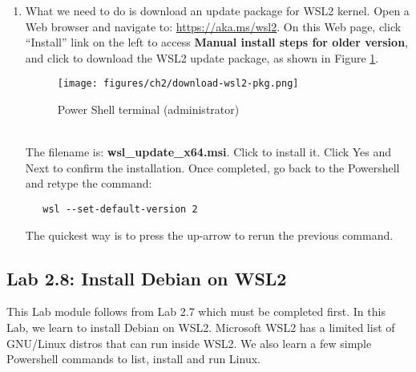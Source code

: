 \begin{enumerate}
\item What we need to do is download an update package for WSL2 kernel. Open a Web browser and navigate to: {\url{https://aka.ms/wsl2}}. On this Web page, click ``Install'' link on the left to access {\bf{Manual install steps for older version}}, and click to download the WSL2 update package, as shown in Figure \ref{fig:download-wsl2}. 
\begin{figure}[hbt!]\centering
\texttt{[image: figures/ch2/download-wsl2-pkg.png]}
\caption{Power Shell terminal (administrator)}\label{fig:download-wsl2} %
\end{figure}
\\
The filename is: {\bf{wsl\_update\_x64.msi}}. Click to install it. Click Yes and Next to confirm the installation. Once completed, go back to the Powershell and retype the command: 
\begin{verbatim}
   wsl --set-default-version 2
\end{verbatim}
The quickest way is to press the up-arrow to rerun the previous command. 
\end{enumerate}  

\subsection*{Lab 2.8: Install Debian on WSL2}
This Lab module follows from Lab 2.7 which must be completed first. In this Lab, we learn to install Debian on WSL2. Microsoft WSL2 has a limited list of GNU/Linux distros that can run inside WSL2. We also learn a few simple Powershell commands to list, install and run Linux. 

